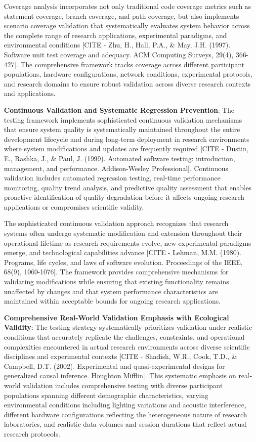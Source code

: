 \documentclass[12pt,a4paper]{report}
\begin{document}
Coverage analysis incorporates not only traditional code coverage metrics such as statement coverage, branch coverage,
and path coverage, but also implements scenario coverage validation that systematically evaluates system behavior across
the complete range of research applications, experimental paradigms, and environmental
conditions [CITE - Zhu, H., Hall, P.A., \& May, J.H. (1997). Software unit test coverage and adequacy. ACM Computing Surveys, 29(4), 366-427].
The comprehensive framework tracks coverage across different participant populations, hardware configurations, network
conditions, experimental protocols, and research domains to ensure robust validation across diverse research contexts
and applications.

\textbf{Continuous Validation and Systematic Regression Prevention}: The testing framework implements sophisticated
continuous validation mechanisms that ensure system quality is systematically maintained throughout the entire
development lifecycle and during long-term deployment in research environments where system modifications and updates
are frequently
required [CITE - Dustin, E., Rashka, J., \& Paul, J. (1999). Automated software testing: introduction, management, and performance. Addison-Wesley Professional].
Continuous validation includes automated regression testing, real-time performance monitoring, quality trend analysis,
and predictive quality assessment that enables proactive identification of quality degradation before it affects ongoing
research applications or compromises scientific validity.

The sophisticated continuous validation approach recognizes that research systems often undergo systematic modification
and extension throughout their operational lifetime as research requirements evolve, new experimental paradigms emerge,
and technological capabilities
advance [CITE - Lehman, M.M. (1980). Programs, life cycles, and laws of software evolution. Proceedings of the IEEE, 68(9), 1060-1076].
The framework provides comprehensive mechanisms for validating modifications while ensuring that existing functionality
remains unaffected by changes and that system performance characteristics are maintained within acceptable bounds for
ongoing research applications.

\textbf{Comprehensive Real-World Validation Emphasis with Ecological Validity}: The testing strategy systematically
prioritizes validation under realistic conditions that accurately replicate the challenges, constraints, and operational
complexities encountered in actual research environments across diverse scientific disciplines and experimental
contexts [CITE - Shadish, W.R., Cook, T.D., \& Campbell, D.T. (2002). Experimental and quasi-experimental designs for generalized causal inference. Houghton Mifflin].
This systematic emphasis on real-world validation includes comprehensive testing with diverse participant populations
spanning different demographic characteristics, varying environmental conditions including lighting variations and
acoustic interference, different hardware configurations reflecting the heterogeneous nature of research laboratories,
and realistic data volumes and session durations that reflect actual research protocols.
\end{document}
